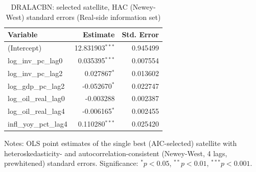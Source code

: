 \begin{table}[!htbp]
\centering
\caption{DRALACBN: selected satellite, HAC (Newey-West) standard errors (Real-side information set)}
\label{tab:dralacbn_real_side_satellite_hac}
\begin{tabular}{lrr}
\toprule
Variable & Estimate & Std. Error \\
\midrule
(Intercept) & 12.831903$^{***}$ & 0.945499 \\
log_inv_pc_lag0 & 0.035395$^{***}$ & 0.007554 \\
log_inv_pc_lag2 & 0.027867$^{*}$ & 0.013602 \\
log_gdp_pc_lag2 & -0.052670$^{*}$ & 0.022747 \\
log_oil_real_lag0 & -0.003288 & 0.002387 \\
log_oil_real_lag4 & -0.006165$^{*}$ & 0.002455 \\
infl_yoy_pct_lag4 & 0.110280$^{***}$ & 0.025420 \\
\bottomrule
\end{tabular}
\begin{tablenotes}
\small
\item Notes: OLS point estimates of the single best (AIC-selected) satellite with heteroskedasticity- and autocorrelation-consistent (Newey-West, 4 lags, prewhitened) standard errors. Significance: $^{*}p<0.05$, $^{**}p<0.01$, $^{***}p<0.001$.
\end{tablenotes}
\end{table}
